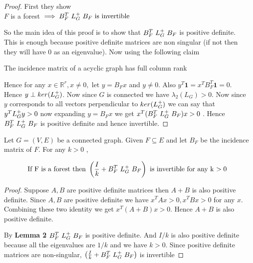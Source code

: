 \begin{proof}
First they show \\ 
$ F$ is a forest $\implies B_F^T \ L_{G}^{+} \ B_F \ \text{is invertible}$ 

So the main idea of this proof is to show that $B_F^T \ \laplacian \ B_F $ is positive definite. This is enough because positive definite matrices are non singular (if not then they will have 0 as an eigenvalue). Now using the following claim
 
 \begin{HXcl}
  The incidence matrix of a acyclic graph has full column rank
 \end{HXcl}
    
Hence for any $x \in \mathbb{R}^r, x \neq 0, \text{ let } y = B_F x$ and $y \neq 0$. Also $y^T \textbf{1} = x^T B_F^T \textbf{1} = 0$. Hence $y \perp ker(L_{G}^{+})$. Now since $G$ is connected we have $\lambda_2(L_G) > 0$. Now since $y$ corresponds to all vectors perpendicular to $ker(L_{G}^{+})$ we can say that $y^T L_{G}^{+} y > 0$ now expanding $y = B_F x$ we get $x^T (B_F^T \ L_{G}^{+} \ B_F) x > 0$ . Hence $B_F^T \ \laplacian \ B_F$ is positive definite and hence invertible. 

\end{proof}


\begin{HXl}
 Let $G = (V, E)$ be a connected graph. Given $F \subseteq E$ and let $B_F$ be the incidence matrix of $F$. For any $k > 0$ , 
 
 $$\text{If F is a forest then } \left( \frac{I}{k} +  B_F^T \ L_{G}^{+} \ B_F \right) \ \text{is invertible for any k $> 0$}$$
\end{HXl}

\begin{proof}
 Suppose $A, B$ are positive definite matrices then $A + B$ is also positive definite. Since $A, B$ are positive definite we have $x^T A x > 0 , x^T B x > 0$ for any $x$. Combining these two identity we get $x^T (A + B) x > 0$. Hence $A + B$ is also positive definite.
 
 By \textbf{Lemma 2} $B_F^T \ \laplacian \ B_F$ is positive definite. And $I/k$ is also positive definite because all the eigenvalues are $1/k$ and we have $k > 0$. Since positive definite matrices are non-singular, $\left( \frac{I}{k} +  B_F^T \ L_{G}^{+} \ B_F \right)$ is invertible
\end{proof}


